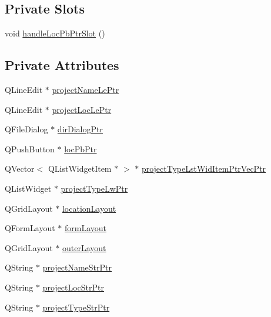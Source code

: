 \subsection*{Private Slots}
\begin{DoxyCompactItemize}
\item 
void \hyperlink{class_new_project_page__2_ad6313493cc847b62a1c219c4ff92ff02}{handle\-Loc\-Pb\-Ptr\-Slot} ()
\end{DoxyCompactItemize}
\subsection*{Private Attributes}
\begin{DoxyCompactItemize}
\item 
Q\-Line\-Edit $\ast$ \hyperlink{class_new_project_page__2_a8d955d78824c84ca7943b1af2ace11b0}{project\-Name\-Le\-Ptr}
\item 
Q\-Line\-Edit $\ast$ \hyperlink{class_new_project_page__2_a86200aed0b692c71dffa0664fa18e25e}{project\-Loc\-Le\-Ptr}
\item 
Q\-File\-Dialog $\ast$ \hyperlink{class_new_project_page__2_a8cf80ba2a09ce1963365aae0f65a65e7}{dir\-Dialog\-Ptr}
\item 
Q\-Push\-Button $\ast$ \hyperlink{class_new_project_page__2_ab5056e3d84ca52cffb2842c398ee04b2}{loc\-Pb\-Ptr}
\item 
Q\-Vector$<$ Q\-List\-Widget\-Item $\ast$ $>$ $\ast$ \hyperlink{class_new_project_page__2_aec2a1254e851902244714526f996d8c8}{project\-Type\-Lst\-Wid\-Item\-Ptr\-Vec\-Ptr}
\item 
Q\-List\-Widget $\ast$ \hyperlink{class_new_project_page__2_aca414e3a3ca361ef6b24d6f849bc1bca}{project\-Type\-Lw\-Ptr}
\item 
Q\-Grid\-Layout $\ast$ \hyperlink{class_new_project_page__2_a17fd912b11ae2dad02da7fa3906f948d}{location\-Layout}
\item 
Q\-Form\-Layout $\ast$ \hyperlink{class_new_project_page__2_afc89c432c8c3cd4740e4a98bbe5f426b}{form\-Layout}
\item 
Q\-Grid\-Layout $\ast$ \hyperlink{class_new_project_page__2_a59c64379dca8c4bf52e60503b76da65e}{outer\-Layout}
\item 
Q\-String $\ast$ \hyperlink{class_new_project_page__2_ad3fb4b5248b01e40660cbb91ebd215c9}{project\-Name\-Str\-Ptr}
\item 
Q\-String $\ast$ \hyperlink{class_new_project_page__2_aeef81f262fde93b45f7264515bee334d}{project\-Loc\-Str\-Ptr}
\item 
Q\-String $\ast$ \hyperlink{class_new_project_page__2_a11cf2e27845bca28160711333975f68c}{project\-Type\-Str\-Ptr}
\end{DoxyCompactItemize}


